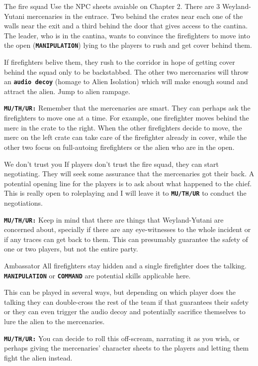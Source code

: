 \begin{rpg-commentbox}{The fire squad}
   Use the NPC sheets avaiable on Chapter 2. There are 3 Weyland-Yutani mercenaries in the entrace. Two behind the crates near each one of the walls near the exit and a third behind the door that gives access to the cantina. The leader, who is in the cantina, wants to convince the firefighters to move into the open (\texttt{\textbf{MANIPULATION}}) lying to the players to rush and get cover behind them.  
   
   If firefighters belive them, they rush to the corridor in hope of getting cover behind the squad only to be backstabbed. The other two mercenaries will throw an \texttt{\textbf{audio decoy}} (homage to Alien Isolation) which will make enough sound and attract the alien. Jump to alien rampage.

   \texttt{\textbf{MU/TH/UR:}} Remember that the mercenaries are smart. They can perhaps ask the firefighters to move one at a time. For example, one firefighter moves behind the merc in the crate to the right. When the other firefighters decide to move, the merc on the left crate can take care of the firefighter already in cover, while the other two focus on full-autoing firefighters or the alien who are in the open.   
\end{rpg-commentbox}


\begin{rpg-commentbox}{We don't trust you}
    If players don't trust the fire squad, they can start negotiating. They will seek some assurance that the mercenaries got their back. A potential opening line for the players is to ask about what happened to the chief. This is really open to roleplaying and I will leave it to \texttt{\textbf{MU/TH/UR}} to conduct the negotiations. 
     
    \texttt{\textbf{MU/TH/UR:}} Keep in mind that there are things that Weyland-Yutani are concerned about, specially if there are any eye-witnesses to the whole incident or if any traces can get back to them. This can presumably guarantee the safety of one or two players, but not the entire party. 
\end{rpg-commentbox}


\begin{rpg-commentbox}{Ambassator}
    All firefighters stay hidden and a single firefighter does the talking. \texttt{\textbf{MANIPULATION}} or \texttt{\textbf{COMMAND}} are potential skills applicable here.
    
    This can be played in several ways, but depending on which player does the talking they can double-cross the rest of the team if that guarantees their safety or they can even trigger the audio decoy and potentially sacrifice themselves to lure the alien to the mercenaries. 
     
    \texttt{\textbf{MU/TH/UR:}} You can decide to roll this off-scream, narrating it as you wish, or perhaps giving the mercenaries' character sheets to the players and letting them fight the alien instead.
\end{rpg-commentbox}


